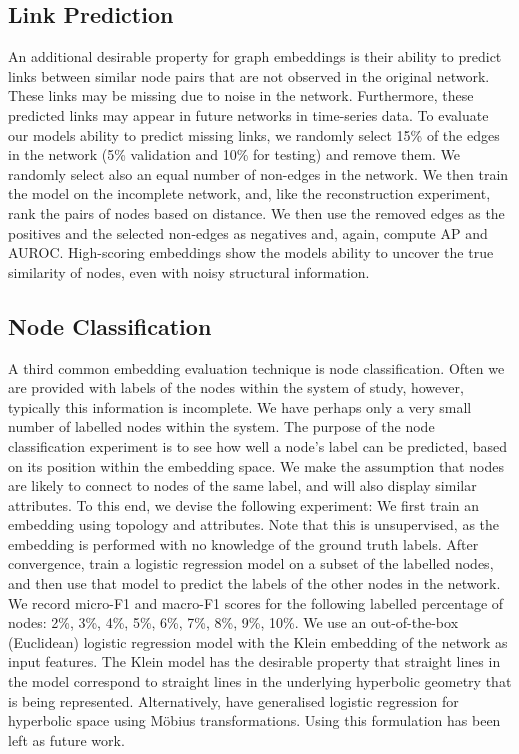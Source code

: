 \documentclass{article}
\begin{document}
\subsection{Link Prediction}
An additional desirable property for graph embeddings is their ability to predict links between similar node pairs that are not observed in the original network. 
These links may be missing due to noise in the network.
Furthermore, these predicted links may appear in future networks in time-series data.
To evaluate our models ability to predict missing links, we randomly select 15\% of the edges in the network (5\% validation and 10\% for testing) and remove them.
We randomly select also an equal number of non-edges in the network.
We then train the model on the incomplete network, and, like the reconstruction experiment, rank the pairs of nodes based on distance.
We then use the removed edges as the positives and the selected non-edges as negatives and, again, compute AP and AUROC.
High-scoring embeddings show the models ability to uncover the true similarity of nodes, even with noisy structural information.

\subsection{Node Classification}
A third common embedding evaluation technique is node classification.
Often we are provided with labels of the nodes within the system of study, however, typically this information is incomplete.
We have perhaps only a very small number of labelled nodes within the system.
The purpose of the node classification experiment is to see how well a node's label can be predicted, based on its position within the embedding space.
We make the assumption that nodes are likely to connect to nodes of the same label, and will also display similar attributes.
To this end, we devise the following experiment:
We first train an embedding using topology and attributes.
Note that this is unsupervised, as the embedding is performed with no knowledge of the ground truth labels.
After convergence, train a  logistic regression model on a subset of the labelled nodes, and then use that model to predict the labels of the other nodes in the network.
We record micro-F1 and macro-F1 scores for the following labelled percentage of nodes: 2\%, 3\%, 4\%, 5\%, 6\%, 7\%, 8\%, 9\%, 10\%.  
We use an out-of-the-box (Euclidean) logistic regression model with the Klein embedding of the network as input features. 
The Klein model has the desirable property that straight lines in the model correspond to straight lines in the underlying hyperbolic geometry that is being represented.
Alternatively, \cite{ganea2018hyperbolic} have generalised logistic regression for hyperbolic space using M\"{o}bius transformations.
Using this formulation has been left as future work.
\end{document}
